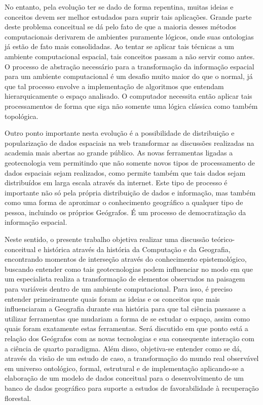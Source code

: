 No entanto, pela evolução ter se dado de forma repentina, muitas ideias e conceitos devem ser melhor estudados para suprir tais aplicações. Grande parte deste problema conceitual se dá pelo fato de que a maioria desses métodos computacionais derivarem de ambientes puramente lógicos, onde suas ontologias já estão de fato mais consolidadas. Ao tentar se aplicar tais técnicas a um ambiente computacional espacial, tais conceitos passam a não servir como antes. O processo de abstração necessário para a transformação da informação espacial para um ambiente computacional é um desafio muito maior do que o normal, já que tal processo envolve a implementação de algoritmos que entendam hierarquicamente o espaço analisado\cite{CAMARA_etal04}. O computador necessita então aplicar tais processamentos de forma que siga não somente uma lógica clássica como também topológica. \par
Outro ponto importante nesta evolução é a possibilidade de distribuição e popularização de dados espaciais na web transformar as discussões realizadas na academia mais abertas ao grande público. As novas ferramentas ligadas a geotecnologia vem permitindo que não somente novos tipos de processamento de dados espaciais sejam realizados, como permite também que tais dados sejam distribuídos em larga escala através da internet. Este tipo de processo é importante não só pela própria distribuição de dados e informação, mas também como uma forma de aproximar o conhecimento geográfico a qualquer tipo de pessoa, incluindo os próprios Geógrafos. É um processo de democratização da informação espacial. \par
Neste sentido, o presente trabalho objetiva realizar uma discussão teórico-conceitual e histórica através da história da Computação e da Geografia, encontrando momentos de interseção através do conhecimento epistemológico, buscando entender como tais geotecnologias podem influenciar no modo em que um especialista realiza a transformação de elementos observados na paisagem para variáveis dentro de um ambiente computacional. Para isso, é preciso entender primeiramente quais foram as ideias e os conceitos que mais influenciaram a Geografia durante sua história para que tal ciência passasse a utilizar ferramentas que mudariam a forma de se estudar o espaço, assim como quais foram exatamente estas ferramentas. Será discutido em que ponto está a relação dos Geógrafos com as novas tecnologias e sua consequente interação com a ciência de quarto paradigma\cite{HEY_etal09}. Além disso, objetiva-se entender como se dá, através da visão de um estudo de caso, a transformação do mundo real observável em universo ontológico, formal, estrutural e de implementação aplicando-se a elaboração de um modelo de dados conceitual para o desenvolvimento de um banco de dados geográfico para suporte a estudos de favorabilidade à recuperação florestal. \par
